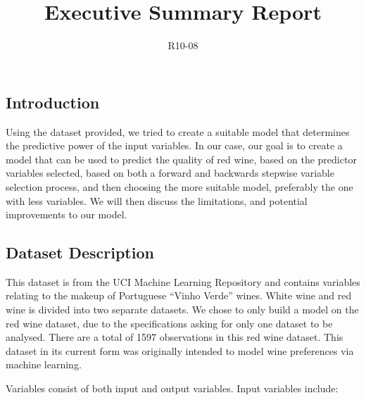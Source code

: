 \documentclass[a4paper,9pt,twocolumn,twoside,]{pinp}
\title{Executive Summary Report}
\author[]{R10-08}
\begin{document}
\verticaladjustment{-2pt}

\maketitle
\thispagestyle{firststyle}



\subsection{Introduction}\label{introduction}

Using the dataset provided, we tried to create a suitable model that
determines the predictive power of the input variables. In our case, our
goal is to create a model that can be used to predict the quality of red
wine, based on the predictor variables selected, based on both a forward
and backwards stepwise variable selection process, and then choosing the
more suitable model, preferably the one with less variables. We will
then discuss the limitations, and potential improvements to our model.

\subsection{Dataset Description}\label{dataset-description}

This dataset is from the UCI Machine Learning Repository and contains
variables relating to the makeup of Portuguese ``Vinho Verde'' wines.
White wine and red wine is divided into two separate datasets. We chose
to only build a model on the red wine dataset, due to the specifications
asking for only one dataset to be analysed. There are a total of 1597
observations in this red wine dataset. This dataset in its current form
was originally intended to model wine preferences via machine learning.

Variables consist of both input and output variables. Input variables
include:
\end{document}
